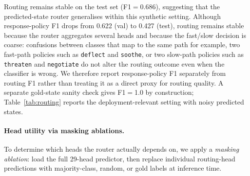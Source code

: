 \documentclass[11pt]{article}
\begin{document}
Routing remains stable on the test set (F1$=$0.686), suggesting that the predicted-state router generalises within this synthetic setting.
Although response-policy F1 drops from 0.622 (val) to 0.427 (test), routing remains stable because the router aggregates several heads and because the fast/slow decision is coarse: confusions between classes that map to the same path for example, two fast-path policies such as \texttt{deflect} and \texttt{soothe}, or two slow-path policies such as \texttt{threaten} and \texttt{negotiate} do not alter the routing outcome even when the classifier is wrong.
We therefore report response-policy F1 separately from routing F1 rather than treating it as a direct proxy for routing quality.
A separate gold-state sanity check gives F1$=$1.0 by construction; Table~\ref{tab:routing} reports the deployment-relevant setting with noisy predicted states.

\paragraph{Head utility via masking ablations.}
To determine which heads the router actually depends on, we apply a \textit{masking ablation}: load the full 29-head predictor, then replace individual routing-head predictions with majority-class, random, or gold labels at inference time.

\begin{table}[t]
\centering
\caption{Masking ablation on routing heads ($n{=}683$ val turns). Baseline (no mask): routing F1$=$0.672, unsafe fast-path$=$0.174. ``Gold'' replaces the predicted head with its gold label; this upper-bounds the gain from a perfect predictor for that head.}
\label{tab:masking_ablation}
\small
{}
\end{table}
\end{document}
